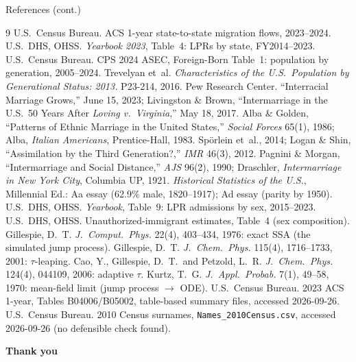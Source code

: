 \documentclass[10pt]{beamer}
\begin{document}
\begin{frame}[shrink]{References (cont.)}
  \tiny
  \begin{thebibliography}{9}
  U.S.\ Census Bureau. ACS 1-year state-to-state migration flows, 2023--2024.
  U.S.\ DHS, OHSS. \textit{Yearbook 2023}, Table~4: LPRs by state, FY2014--2023.
  U.S.\ Census Bureau. CPS 2024 ASEC, Foreign-Born Table~1: population by generation, 2005--2024.
  Trevelyan et~al. \textit{Characteristics of the U.S.\ Population by Generational Status: 2013.} P23-214, 2016.
  Pew Research Center. ``Interracial Marriage Grows,'' June 15, 2023; Livingston \& Brown, ``Intermarriage in the U.S.\ 50 Years After \textit{Loving v.\ Virginia},'' May 18, 2017.
  Alba \& Golden, ``Patterns of Ethnic Marriage in the United States,'' \textit{Social Forces} 65(1), 1986; Alba, \textit{Italian Americans}, Prentice-Hall, 1983.
  Sp\"orlein et~al., 2014; Logan \& Shin, ``Assimilation by the Third Generation?,'' \textit{IMR} 46(3), 2012.
  Pagnini \& Morgan, ``Intermarriage and Social Distance,'' \textit{AJS} 96(2), 1990; Draschler, \textit{Intermarriage in New York City}, Columbia UP, 1921.
  \textit{Historical Statistics of the U.S.}, Millennial Ed.: Aa essay (62.9\% male, 1820--1917); Ad essay (parity by 1950).
  U.S.\ DHS, OHSS. \textit{Yearbook}, Table~9: LPR admissions by sex, 2015--2023.
  U.S.\ DHS, OHSS. Unauthorized-immigrant estimates, Table~4 (sex composition).
  Gillespie, D.~T. \textit{J.\ Comput.\ Phys.} 22(4), 403--434, 1976: exact SSA (the simulated jump process).
  Gillespie, D.~T. \textit{J.\ Chem.\ Phys.} 115(4), 1716--1733, 2001: $\tau$-leaping.
  Cao, Y., Gillespie, D.~T.\ and Petzold, L.~R. \textit{J.\ Chem.\ Phys.} 124(4), 044109, 2006: adaptive $\tau$.
  Kurtz, T.~G. \textit{J.\ Appl.\ Probab.} 7(1), 49--58, 1970: mean-field limit (jump process $\to$ ODE).
  U.S.\ Census Bureau. 2023 ACS 1-year, Tables B04006/B05002, table-based summary files, accessed 2026-09-26.
  U.S.\ Census Bureau. 2010 Census surnames, \texttt{Names\_2010Census.csv}, accessed 2026-09-26 (no defensible check found).
  \end{thebibliography}
\end{frame}

\begin{frame}
  \vfill
  \centering
  {\Large\bfseries\color{nmblue} Thank you}
  \vfill
\end{frame}
\end{document}
